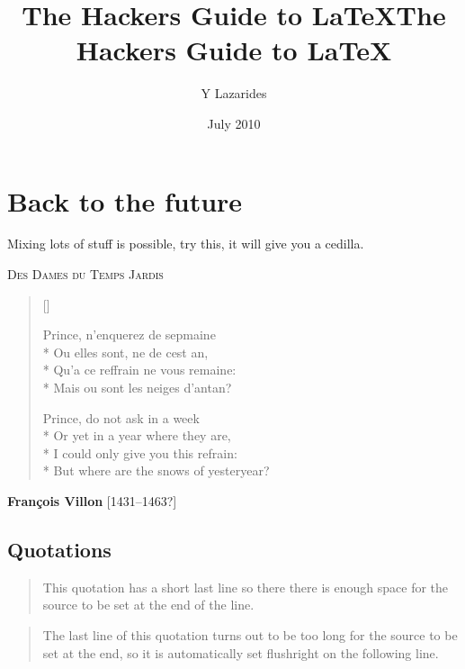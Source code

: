 \documentclass[a4paper, oneside]{tufte-book} %
\title{The Hackers Guide to LaTeX}
\title{The Hackers Guide to LaTeX}
\author{Y Lazarides}
\date{July 2010} %
\begin{document}
\newcommand{\cs}[1]{$\backslash$#1}
\maketitle
\tableofcontents* %
\newpage





\chapter{Back to the future}
Mixing lots of stuff is possible, try this, it will give you a cedilla.

\begin{center}
\textsc{Des Dames du Temps Jardis}
\end{center}%
\settowidth{0.5\linewidth}{Or yet in a year where they are}
\begin{verse}[\versewidth] \begin{itshape}
Prince, n’enquerez de sepmaine \\*
Ou elles sont, ne de cest an, \\*
Qu’a ce reffrain ne vous remaine: \\*
Mais ou sont les neiges d’antan?
\end{itshape}
Prince, do not ask in a week \\*
Or yet in a year where they are, \\*
I could only give you this refrain: \\*
But where are the snows of yesteryear?
\end{verse}
\begin{flushright}
{\bfseries Fran\c{c}ois Villon} [1431--1463?]
\end{flushright}

\section{Quotations}

\begin{quotation}
This quotation has a short last line so there there is enough space
for the source to be set at
the end of the line.
\end{quotation}
\begin{quotation}
The last line of this quotation turns out to be too long for
the source to be set at the end, so it is automatically
set flushright on the following line.
\end{quotation}
\end{document}

